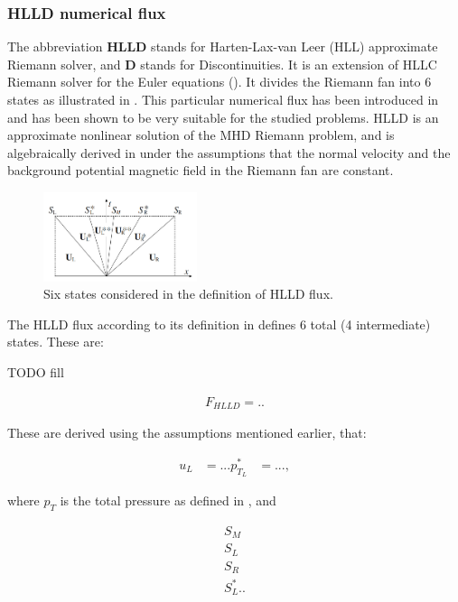 \subsubsection{HLLD numerical flux}
The abbreviation \textbf{HLLD} stands for Harten-Lax-van Leer (HLL) approximate Riemann solver, and \textbf{D} stands for Discontinuities. It is an extension of HLLC Riemann solver for the Euler equations (\cite{hllc}). It divides the Riemann fan into 6 states as illustrated in . This particular numerical flux has been introduced in \cite{hlld} and has been shown to be very suitable for the studied problems. HLLD is an approximate nonlinear solution of the MHD Riemann problem, and is algebraically derived in \cite{hlld} under the assumptions that the normal velocity and the background potential magnetic field in the Riemann fan are constant.

\begin{figure}[H]
	\centering
		\includegraphics[width=0.4\textwidth]{img/riemann/hlldStates.jpg}
		\vspace{-3mm}
	\caption{Six states considered in the definition of HLLD flux.}
	\label{figure:hlldRiemannStates}
\end{figure}

The HLLD flux according to its definition in \cite{hlld} defines 6 total (4 intermediate) states. These are:

TODO fill

\begin{align}
F_{HLLD} = ..
\end{align}

These are derived using the assumptions mentioned earlier, that:

\begin{align}
u_L & = ...
p^*_{T_L} & = ...,
\end{align}

where $p_T$ is the total pressure as defined in , and

\begin{align}
S_M\\
S_L\\
S_R\\
S^{*}_L..
\end{align}


